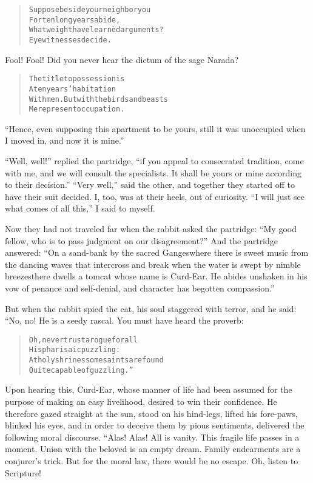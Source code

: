 \documentclass[article, twoside, 14pt]{memoir}
\renewenvironment{verbatim}{%
\begin{quote}%
\vskip -10pt%
\begin{alltt}\normalfont\large}{\end{alltt}%
\end{quote}%
\vskip -10pt
} %
\begin{document}
\begin{verbatim}
Suppose beside your neighbor you
    For ten long years abide,
What weight have learnèd arguments?
    Eyewitnesses decide.
\end{verbatim}
Fool! Fool! Did you never hear the dictum of the sage Narada?

\begin{verbatim}
The title to possession is
    A ten years' habitation
With men. But with the birds and beasts
    Mere present occupation.
\end{verbatim}
``Hence, even supposing this apartment to be yours, still it was unoccupied when I moved in, and now it is mine.''

``Well, well!'' replied the partridge,
``if you appeal to consecrated tradition, come with me, and we will consult the specialists. It shall be yours or mine according to their decision.''
``Very well,'' said the other, and together they started off to
have their suit decided. I, too, was at their heels, out of
curiosity. ``I will just see what comes of all this,'' I said to
myself.

Now they had not traveled far when the rabbit asked the partridge:
``My good fellow, who is to pass judgment on our disagreement?''
And the partridge answered:
``On a sand-bank by the sacred Ganges{\textemdash}where there is sweet music from the dancing waves that intercross and break when the water is swept by nimble breezes{\textemdash}there dwells a tomcat whose name is Curd-Ear. He abides unshaken in his vow of penance and self-denial, and character has begotten compassion.''

But when the rabbit spied the cat, his soul staggered with terror,
and he said: “No, no! He is a seedy rascal. You must have heard the
proverb:

\begin{verbatim}
Oh, never trust a rogue for all
    His pharisaic puzzling:
At holy shrines some saints are found
    Quite capable of guzzling.”
\end{verbatim}
Upon hearing this, Curd-Ear, whose manner of life had been assumed
for the purpose of making an easy livelihood, desired to win their
confidence. He therefore gazed straight at the sun, stood on his
hind-legs, lifted his fore-paws, blinked his eyes, and in order to
deceive them by pious sentiments, delivered the following moral
discourse. “Alas! Alas! All is vanity. This fragile life passes in
a moment. Union with the beloved is an empty dream. Family
endearments are a conjurer's trick. But for the moral law, there
would be no escape. Oh, listen to Scripture!
\end{document}
